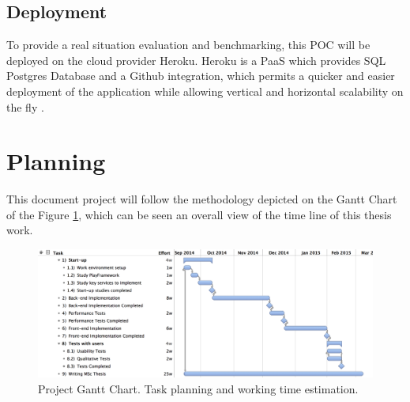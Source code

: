 
\subsection{Deployment}
To provide a real situation evaluation and benchmarking, this POC will be deployed on the cloud provider Heroku. Heroku is a PaaS which provides SQL Postgres Database and a Github integration, which permits a quicker and easier deployment of the application while allowing vertical and horizontal scalability on the fly \cite{Heroku}. 


\section{Planning}
\label{Planning}

This document project will follow the methodology depicted on the Gantt Chart of the Figure \ref{fig:PlaneamentoTese}, which can be seen an overall view of the time line of this thesis work.

\begin{figure}[h!]
  \centering
  \includegraphics[width=1\textwidth]{img/PlaneamentoTese.jpg}
  \caption{Project Gantt Chart. Task planning and working time estimation.}
  \label{fig:PlaneamentoTese}
\end{figure}


